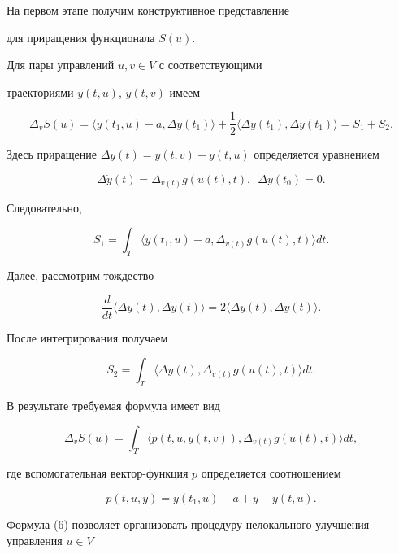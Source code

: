 На первом этапе получим конструктивное представление 


для приращения функционала $S(u)$.


Для пары управлений $u,v\in V$ с соответствующими 


траекториями $y(t,u)$, $y(t,v)$ имеем


$$


\Delta_{v}S(u)=\langle y(t_{1},u)-a,\Delta y(t_{1})\rangle+


\frac{1}{2}\langle\Delta y(t_{1}),\Delta y(t_{1})\rangle=S_{1}+S_{2}.


$$


Здесь приращение $\Delta y(t)=y(t,v)-y(t,u)$ определяется уравнением


$$


\Delta\Dot{y}(t)=\Delta_{v(t)}g(u(t),t),\ \;\Delta y(t_{0})=0. 


$$


Следовательно,


$$


S_{1}=\int_{T}\langle y(t_{1},u)-a,\Delta_{v(t)}g(u(t),t)\rangle dt.


$$


Далее, рассмотрим тождество


$$


\frac{d}{dt}\langle\Delta y(t),\Delta y(t)\rangle=


2\langle\Delta\Dot{y}(t),\Delta y(t)\rangle.


$$


После интегрирования получаем


$$


S_{2}=\int_{T}\langle\Delta y(t),\Delta_{v(t)}g(u(t),t)\rangle dt.


$$


В результате требуемая формула имеет вид


\begin{equation}


\Delta_{v}S(u)=\int_{T}\langle p(t,u,y(t,v)),\Delta_{v(t)}g(u(t),t)\rangle dt,


\end{equation}


где вспомогательная вектор-функция $p$ определяется соотношением


$$


p(t,u,y)=y(t_{1},u)-a+y-y(t,u).


$$





Формула (6) позволяет организовать процедуру нелокального улучшения управления $u\in V$


